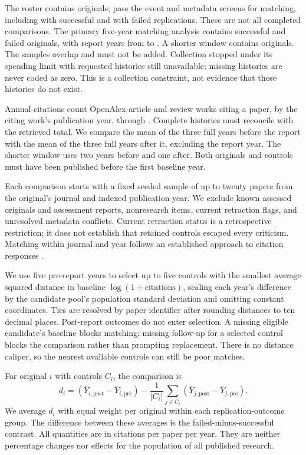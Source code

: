 \documentclass[11pt,letterpaper]{article}
\begin{document}
The roster contains \RosterOriginals{} originals; \EligibleOriginals{} pass the event and metadata screens for matching, including \EligibleSuccessful{} with successful and \EligibleFailed{} with failed replications. These are not all completed comparisons. The primary five-year matching analysis contains \MainSuccessfulN{} successful and \MainFailedN{} failed originals, with report years from \FirstEventYear{} to \LastEventYear{}. A shorter window contains \ShortDifferenceN{} originals. The samples overlap and must not be added. Collection stopped under its spending limit with \StoppedHistories{} requested histories still unavailable; missing histories are never coded as zero. This is a collection constraint, not evidence that those histories do not exist.

Annual citations count OpenAlex article and review works citing a paper, by the citing work's publication year, through \CitationsThrough{} \citep{openalex2022}. Complete histories must reconcile with the retrieved total. We compare the mean of the three full years before the report with the mean of the three full years after it, excluding the report year. The shorter window uses two years before and one after. Both originals and controls must have been published before the first baseline year.

Each comparison starts with a fixed seeded sample of up to twenty papers from the original's journal and indexed publication year. We exclude known assessed originals and assessment reports, nonresearch items, current retraction flags, and unresolved metadata conflicts. Current retraction status is a retrospective restriction; it does not establish that retained controls escaped every criticism. Matching within journal and year follows an established approach to citation responses \citep{furman2012,schafmeister2021}.

We use five pre-report years to select up to five controls with the smallest average squared distance in baseline $\log(1+\text{citations})$, scaling each year's difference by the candidate pool's population standard deviation and omitting constant coordinates. Ties are resolved by paper identifier after rounding distances to ten decimal places. Post-report outcomes do not enter selection. A missing eligible candidate's baseline blocks matching; missing follow-up for a selected control blocks the comparison rather than prompting replacement. There is no distance caliper, so the nearest available controls can still be poor matches.

For original $i$ with controls $C_i$, the comparison is
\begin{equation}
 d_i = \left(\overline{Y}_{i,\mathrm{post}}-\overline{Y}_{i,\mathrm{pre}}\right)
 -\frac{1}{|C_i|}\sum_{j\in C_i}
 \left(\overline{Y}_{j,\mathrm{post}}-\overline{Y}_{j,\mathrm{pre}}\right).
\end{equation}
We average $d_i$ with equal weight per original within each replication-outcome group. The difference between these averages is the failed-minus-successful contrast. All quantities are in citations per paper per year. They are neither percentage changes nor effects for the population of all published research.
\end{document}
